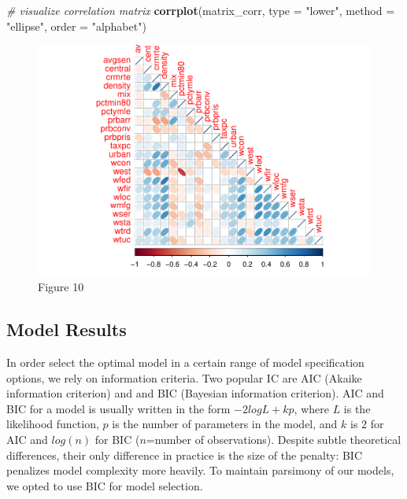\documentclass[]{article}
\newenvironment{Shaded}{\begin{snugshade}}{\end{snugshade}}
\newcommand{\CommentTok}[1]{\textcolor[rgb]{0.56,0.35,0.01}{\textit{#1}}}
\newcommand{\DataTypeTok}[1]{\textcolor[rgb]{0.13,0.29,0.53}{#1}}
\newcommand{\KeywordTok}[1]{\textcolor[rgb]{0.13,0.29,0.53}{\textbf{#1}}}
\newcommand{\NormalTok}[1]{#1}
\newcommand{\StringTok}[1]{\textcolor[rgb]{0.31,0.60,0.02}{#1}}
\begin{document}
\begin{Shaded}
\begin{Highlighting}[]
\CommentTok{# visualize correlation matrix }
\KeywordTok{corrplot}\NormalTok{(matrix_corr, }\DataTypeTok{type =} \StringTok{"lower"}\NormalTok{, }\DataTypeTok{method =} \StringTok{"ellipse"}\NormalTok{, }\DataTypeTok{order =} \StringTok{"alphabet"}\NormalTok{)}
\end{Highlighting}
\end{Shaded}

\begin{figure}

{\centering \includegraphics{lab_3_final_files/figure-latex/unnamed-chunk-32-1} 

}

\caption{Figure 10}\label{fig:unnamed-chunk-32}
\end{figure}

\hypertarget{model-results}{%
\subsection{Model Results}\label{model-results}}

In order select the optimal model in a certain range of model
specification options, we rely on information criteria. Two popular IC
are AIC (Akaike information criterion) and and BIC (Bayesian information
criterion). AIC and BIC for a model is usually written in the form
\(-2logL + kp\), where \(L\) is the likelihood function, \(p\) is the
number of parameters in the model, and \(k\) is \(2\) for AIC and
\(log(n)\) for BIC (\(n\)=number of observations). Despite subtle
theoretical differences, their only difference in practice is the size
of the penalty: BIC penalizes model complexity more heavily. To maintain
parsimony of our models, we opted to use BIC for model selection.
\end{document}
